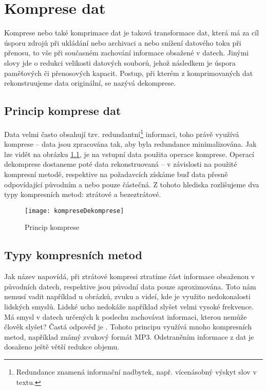 \chapter{Komprese dat}
Komprese nebo také komprimace dat je taková transformace dat, která má za cíl úsporu zdrojů při ukládání nebo archivaci a nebo snížení datového toku při přenosu, to vše při současném zachování informace obsažené v datech. Jinými slovy jde o redukci velikosti datových souborů, jehož následkem je úspora paměťových či přenosových kapacit. Postup, při kterém z komprimovaných dat rekonstruujeme data originální, se nazývá dekomprese.

\section{Princip komprese dat}
\label{sekcePrincipKompreseDat}
Data velmi často obsahují tzv. redundantní\footnote{Redundance znamená informační nadbytek, např. vícenásobný výskyt slov v textu.} informaci, toho právě využívá komprese -- data jsou zpracována tak, aby byla redundance minimalizována. Jak lze vidět na obrázku \ref{kompreseDekomprese}, je na vstupní data použita operace komprese. Operací dekomprese dostaneme poté data rekonstruovaná -- v závislosti na použité kompresní metodě, respektive na požadavcích získáme buď data přesně odpovídající původním a nebo pouze částečná. Z tohoto hlediska rozlišujeme dva typy kompresních metod: ztrátové a bezeztrátové.

\begin{figure}[!htb]
\centering
\texttt{[image: kompreseDekomprese]}
\caption{Princip komprese}
\label{kompreseDekomprese}
\end{figure}

\section{Typy kompresních metod}
Jak název napovídá, při ztrátové kompresi ztratíme část informace obsaženou v původních datech, respektive jsou původní data pouze aproximována.  Toto nám nemusí vadit například u obrázků, zvuku a videí, kde je využito nedokonalosti lidských smyslů. Lidské ucho nedokáže například slyšet velmi vysoké frekvence. Má smysl v datech určených k poslechu zachovávat informaci, kterou nemůže člověk slyšet? Častá odpověď je . Tohoto principu využívá mnoho kompresních metod, například známý zvukový formát MP3. Odstraněním  informace z dat je dosaženo ještě větší redukce objemu. 

